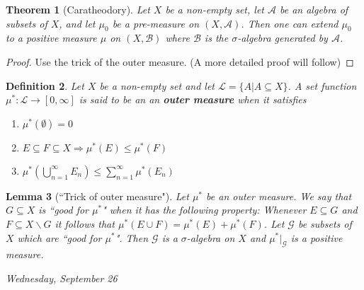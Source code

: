 \documentclass[letterpaper, 12pt]{article}
\newcommand{\cL}{\mathcal{L}}
\newcommand{\cB}{\mathcal{B}}
\newcommand{\cG}{\mathcal{G}}
\newcommand{\sA}{\mathcal{A}}
\theoremstyle{stdthm}
\newtheorem{thm}{Theorem}[section]
\newtheorem{lem}[thm]{Lemma}
\theoremstyle{stddef}
\newtheorem{defn}[thm]{Definition}
\theoremstyle{stdnonum}
\theoremstyle{stdqands}
\theoremstyle{stdbold}
\begin{document}
\begin{thm}[Caratheodory]
Let $X$ be a non-empty set, let $\sA$ be an algebra of subsets of $X$, and let $\mu_0$ be a pre-measure on $(X,\sA)$. Then one can extend $\mu_0$ to a positive measure $\mu$ on $(X,\cB)$ where $\cB$ is the $\sigma$-algebra generated by $\sA$. 
\end{thm}

\begin{proof}
Use the trick of the outer measure. (A more detailed proof will follow)
\end{proof}

\begin{defn}
Let $X$ be a non-empty set and let $\cL = \{A|A\subseteq X\}$. A set function $\mu^*: \cL \rightarrow [0,\infty]$ is said to be an an {\bf outer measure} when it satisfies 
\begin{enumerate}
\item $\mu^*(\emptyset) = 0$
\item $E\subseteq F \subseteq X \Rightarrow\mu^*(E) \leq \mu^*(F)$
\item $\mu^*(\bigcup_{n=1}^\infty E_n) \leq \sum_{n=1}^\infty \mu^*(E_n)$
\end{enumerate}
\end{defn}

\begin{lem}[``Trick of outer measure"]
Let $\mu^*$ be an outer measure. We say that $G\subseteq X$ is ``good for $\mu^*$" when it has the following property: Whenever $E\subseteq G$ and $F\subseteq X\backslash G$ it follows that $\mu^*(E \cup F) = \mu^*(E) + \mu^*(F)$. Let $\cG$ be subsets of $X$ which are ``good for $\mu^*$". Then $\cG$ is a $\sigma$-algebra on $X$ and $\mu^*|_\cG$ is a positive measure.  
\end{lem}

\begin{center}
\emph{Wednesday, September  26}
\end{center}
\end{document}
